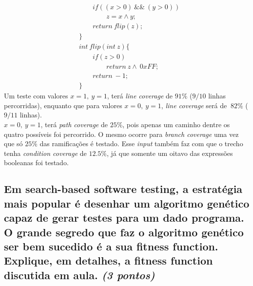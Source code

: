 \documentclass[paper=a4, fontsize=11pt]{scrartcl} %
\numberwithin{equation}{section} %
\numberwithin{figure}{section} %
\numberwithin{table}{section} %
\begin{document}
\begin{itemize}
\begin{align*}
             & \qquad if((x>0)\ \&\&\ (y>0))\\
             & \qquad \qquad z=x \wedge y;\\
             & \qquad return\ flip(z);\\
             & \}\\
             & int\ flip(int\ z)\{\\
             &\qquad if(z>0)\\
             &\qquad \qquad return\ z \wedge\ 0xFF;\\
             &\qquad return\ -1;\\
             &\}
         \end{align*}
         Um teste com valores $x = 1,\ y = 1$, terá \textit{line coverage} de $91\%$ ($9/10$ linhas percorridas), enquanto que para valores $x = 0,\ y = 1$, \textit{line coverage} será de $~82\%$ ($9/11$ linhas).\\
          $x = 0,\ y = 1$, terá \textit{path coverage} de $25\%$, pois apenas um caminho dentre os quatro possíveis foi percorrido. O mesmo ocorre para \textit{branch coverage} uma vez que só $25\%$ das ramificações é testado. Esse \textit{input} também faz com que o trecho tenha \textit{condition coverage} de $12.5\%$, já que somente um oitavo das expressões booleanas foi testado.
          
    \end{itemize}

\subsection{Em search-based software testing, a estratégia mais popular é desenhar um algoritmo genético capaz de gerar testes para um dado programa. O grande segredo que faz o algoritmo genético ser bem sucedido é a sua fitness function. Explique, em detalhes, a fitness function discutida em aula. \textit{(3 pontos)}}
\end{document}
